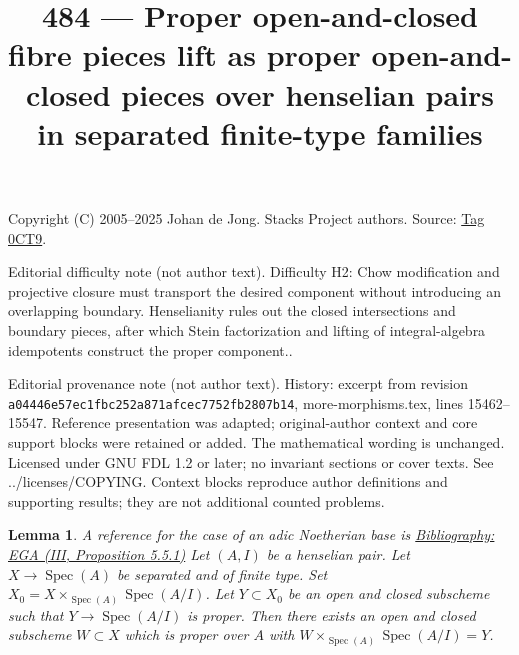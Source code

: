 \documentclass{amsart}
\newenvironment{reference}{\comment}{\endcomment}
\theoremstyle{plain}
\newtheorem{lemma}[subsection]{Lemma}
\theoremstyle{definition}
\theoremstyle{remark}
\numberwithin{equation}{subsection}
\def\Spec{\mathop{\mathrm{Spec}}}
\begin{document}
\title[Stacks Project, Tag 0CT9]{484 --- Proper open-and-closed fibre pieces lift as proper open-and-closed pieces over henselian pairs in separated finite-type families}
\maketitle
\noindent Copyright (C) 2005--2025 Johan de Jong. Stacks Project authors. Source: \href{https://stacks.math.columbia.edu/tag/0CT9}{Tag 0CT9}.

\noindent Editorial difficulty note (not author text). Difficulty H2: Chow modification and projective closure must transport the desired component without introducing an overlapping boundary. Henselianity rules out the closed intersections and boundary pieces, after which Stein factorization and lifting of integral-algebra idempotents construct the proper component..

\noindent Editorial provenance note (not author text). History: excerpt from revision \texttt{a0444\allowbreak 6e57e\allowbreak c1fbc\allowbreak 252a8\allowbreak 71afc\allowbreak ec775\allowbreak 2fb28\allowbreak 07b14}, more-morphisms.tex, lines 15462--15547. Reference presentation was adapted; original-author context and core support blocks were retained or added. The mathematical wording is unchanged. Licensed under GNU FDL 1.2 or later; no invariant sections or cover texts. See ../licenses/COPYING. Context blocks reproduce author definitions and supporting results; they are not additional counted problems.

\begin{lemma}
\label{lemma-split-off-proper-part-henselian}
\begin{reference}
A reference for the case of an adic Noetherian base is
\href{https://stacks.math.columbia.edu/bibliography}{Bibliography: EGA (III, Proposition 5.5.1)}
\end{reference}
Let $(A, I)$ be a henselian pair. Let $X \to \Spec(A)$
be separated and of finite type. Set $X_0 = X \times_{\Spec(A)} \Spec(A/I)$.
Let $Y \subset X_0$ be an open and closed subscheme such that
$Y \to \Spec(A/I)$ is proper. Then there exists an open and closed
subscheme $W \subset X$ which is proper over $A$ with
$W \times_{\Spec(A)} \Spec(A/I) = Y$.
\end{lemma}
\end{document}
